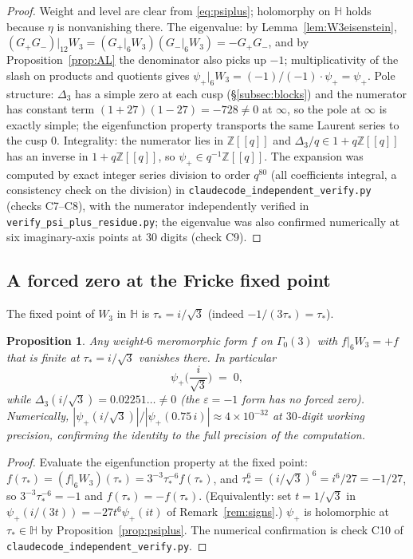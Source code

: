 \documentclass[11pt,reqno]{amsart}
\theoremstyle{plain}
\newtheorem{proposition}[theorem]{Proposition}
\theoremstyle{definition}
\theoremstyle{remark}
\newcommand{\Z}{\mathbb{Z}}
\newcommand{\HH}{\mathbb{H}}
\newcommand{\eps}{\varepsilon}
\newcommand{\Dthree}{\Delta_{3}}
\newcommand{\psip}{\psi_{+}}
\begin{document}
\begin{proof}
Weight and level are clear from \eqref{eq:psiplus};
holomorphy on $\HH$ holds because $\eta$ is nonvanishing there.  The
eigenvalue: by Lemma~\ref{lem:W3eisenstein},
$(G_+G_-)|_{12}W_3=(G_+|_6W_3)(G_-|_6W_3)=-G_+G_-$, and by
Proposition~\ref{prop:AL} the denominator also picks up $-1$;
multiplicativity of the slash on products and quotients gives
$\psip|_6W_3=(-1)/(-1)\cdot\psip=\psip$.  Pole structure: $\Dthree$
has a simple zero at each cusp (\S\ref{subsec:blocks}) and the
numerator has constant term $(1+27)(1-27)=-728\ne0$ at $\infty$, so
the pole at $\infty$ is exactly simple; the eigenfunction property
transports the same Laurent series to the cusp $0$.  Integrality: the
numerator lies in $\Z[[q]]$ and
$\Dthree/q\in1+q\Z[[q]]$ has an inverse in $1+q\Z[[q]]$, so
$\psip\in q^{-1}\Z[[q]]$.  The expansion was computed by exact integer
series division to order $q^{80}$ (all coefficients integral, a
consistency check on the division) in
\texttt{claudecode\_independent\_verify.py} (checks C7--C8), with the
numerator independently verified in
\texttt{verify\_psi\_plus\_residue.py}; the eigenvalue was also
confirmed numerically at six imaginary-axis points at $30$ digits
(check C9).
\end{proof}

\subsection{A forced zero at the Fricke fixed point}

The fixed point of $W_3$ in $\HH$ is $\tau_*=i/\sqrt3$
(indeed $-1/(3\tau_*)=\tau_*$).

\begin{proposition}\label{prop:forcedzero}
Any weight-$6$ meromorphic form $f$ on $\Gamma_0(3)$ with
$f|_6W_3=+f$ that is finite at $\tau_*=i/\sqrt3$ vanishes there.  In
particular
\[
\psip\!\Big(\frac{i}{\sqrt3}\Big)\;=\;0 ,
\]
while $\Dthree(i/\sqrt3)=0.02251\ldots\ne0$ (the $\eps=-1$ form has no
forced zero).  Numerically,
$|\psip(i/\sqrt3)|/|\psip(0.75\,i)|\approx4\times10^{-32}$ at
$30$-digit working precision, confirming the identity to the full
precision of the computation.
\end{proposition}

\begin{proof}
Evaluate the eigenfunction property at the fixed point:
$f(\tau_*)=(f|_6W_3)(\tau_*)=3^{-3}\tau_*^{-6}f(\tau_*)$, and
$\tau_*^6=(i/\sqrt3)^6=i^6/27=-1/27$, so $3^{-3}\tau_*^{-6}=-1$ and
$f(\tau_*)=-f(\tau_*)$.  (Equivalently: set $t=1/\sqrt3$ in
$\psip(i/(3t))=-27t^6\psip(it)$ of Remark~\ref{rem:signs}.)
$\psip$ is holomorphic at $\tau_*\in\HH$ by
Proposition~\ref{prop:psiplus}.  The numerical confirmation is check
C10 of \texttt{claudecode\_independent\_verify.py}.
\end{proof}
\end{document}
